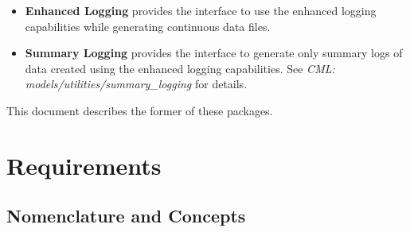 \documentclass[11pt,fleqn]{report}
\begin{document}
\begin{itemize}
  \item \textbf{Enhanced Logging} provides the interface to use the enhanced
        logging capabilities while generating continuous data files.
  \item \textbf{Summary Logging} provides the interface to generate only
        summary logs of data created using the enhanced logging
        capabilities.
        See \textit{CML: models/utilities/summary\_logging} for details.
\end{itemize}

This document describes the former of these packages.

\chapter {Requirements}
\section{Nomenclature and Concepts}\label{sec:2:concepts}
\end{document}
